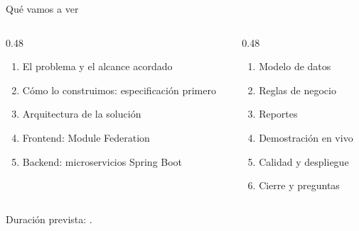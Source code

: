 %

\begin{frame}{Qué vamos a ver}

  \begin{columns}[T]
    \begin{column}{0.48\textwidth}
      \begin{enumerate}[leftmargin=*]
        \item El problema y el alcance acordado
        \item Cómo lo construimos: especificación primero
        \item Arquitectura de la solución
        \item Frontend: Module Federation
        \item Backend: microservicios Spring Boot
      \end{enumerate}
    \end{column}
    \begin{column}{0.48\textwidth}
      \begin{enumerate}[leftmargin=*,start=6]
        \item Modelo de datos
        \item Reglas de negocio
        \item Reportes
        \item \alert{Demostración en vivo}
        \item Calidad y despliegue
        \item Cierre y preguntas
      \end{enumerate}
    \end{column}
  \end{columns}

  \vspace{4pt}
  {\footnotesize\color{textoSuave} Duración prevista: \duracionTotal.}
\end{frame}
